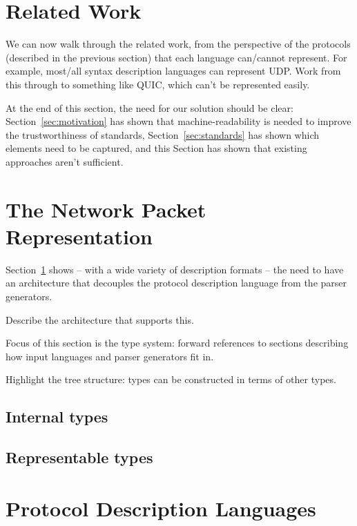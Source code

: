 \documentclass[10pt,twocolumn,a4paper]{article}
\begin{document}
\section{Related Work}
\label{sec:related}

We can now walk through the related work, from the perspective of the protocols
(described in the previous section) that each language can/cannot represent.
For example, most/all syntax description languages can represent UDP. Work from
this through to something like QUIC, which can't be represented easily.

At the end of this section, the need for our solution should be clear:
Section~\ref{sec:motivation} has shown that machine-readability is needed to
improve the trustworthiness of standards, Section~\ref{sec:standards} has shown
which elements need to be captured, and this Section has shown that existing
approaches aren't sufficient.

\section{The Network Packet Representation}

Section~\ref{sec:related} shows -- with a wide variety of description formats --
the need to have an architecture that decouples the protocol description
language from the parser generators.

Describe the architecture that supports this.

Focus of this section is the type system: forward references to sections
describing how input languages and parser generators fit in.

Highlight the tree structure: types can be constructed in terms of other types.

\subsection{Internal types}
\subsection{Representable types}

\section{Protocol Description Languages}
\end{document}
